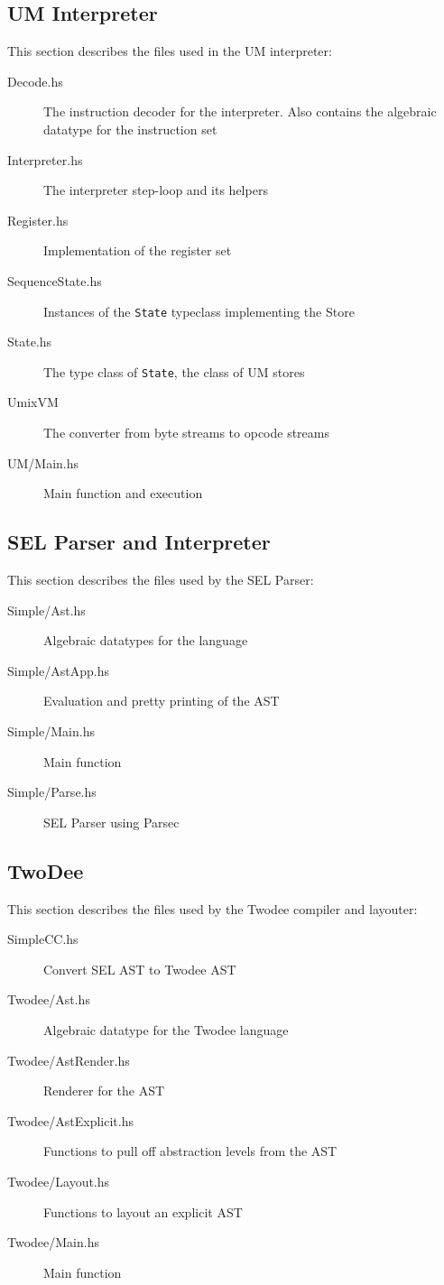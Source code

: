 

\subsection{UM Interpreter}
This section describes the files used in the UM interpreter:
\begin{description}
\item[Decode.hs] The instruction decoder for the interpreter. Also
  contains the algebraic datatype for the instruction set
\item[Interpreter.hs] The interpreter step-loop and its helpers
\item[Register.hs] Implementation of the register set
\item[SequenceState.hs] Instances of the \texttt{State} typeclass
  implementing the Store
\item[State.hs] The type class of \texttt{State}, the class of UM stores
\item[UmixVM] The converter from byte streams to opcode streams
\item[UM/Main.hs] Main function and execution
\end{description}

\subsection{SEL Parser and Interpreter}
This section describes the files used by the SEL Parser:
\begin{description}
\item[Simple/Ast.hs]    Algebraic datatypes for the language
\item[Simple/AstApp.hs] Evaluation and pretty printing of the AST
\item[Simple/Main.hs]   Main function
\item[Simple/Parse.hs]  SEL Parser using Parsec
\end{description}

\subsection{TwoDee}
This section describes the files used by the Twodee compiler and layouter:
\begin{description}
\item[SimpleCC.hs]   Convert SEL AST to Twodee AST
\item[Twodee/Ast.hs] Algebraic datatype for the Twodee language
\item[Twodee/AstRender.hs] Renderer for the AST
\item[Twodee/AstExplicit.hs] Functions to pull off abstraction levels
  from the AST
\item[Twodee/Layout.hs] Functions to layout an explicit AST
\item[Twodee/Main.hs] Main function
\end{description}


